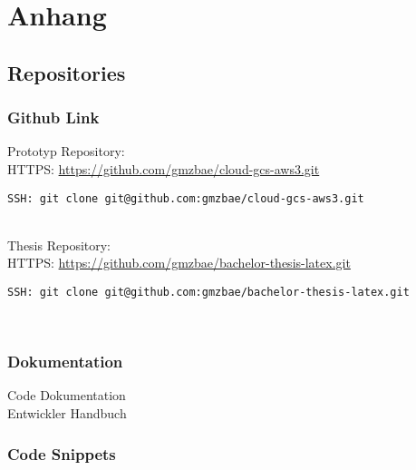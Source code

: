 
\chapter{Anhang}

\section{Repositories}
\subsection{Github Link}

\large{Prototyp Repository:}\\

HTTPS: \url{https://github.com/gmzbae/cloud-gcs-aws3.git}

\begin{verbatim}SSH: git clone git@github.com:gmzbae/cloud-gcs-aws3.git\end{verbatim}\\				

\large{Thesis Repository:}\\

HTTPS: \url{https://github.com/gmzbae/bachelor-thesis-latex.git}

\begin{verbatim}SSH: git clone git@github.com:gmzbae/bachelor-thesis-latex.git \end{verbatim}\\

\subsection{Dokumentation}

Code Dokumentation\\
Entwickler Handbuch

\subsection{Code Snippets}

\clearpage